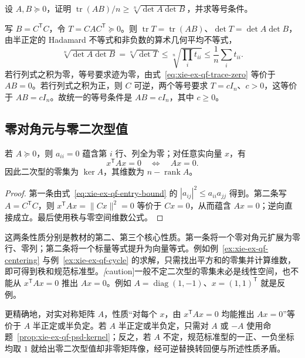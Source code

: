 \begin{example}
设 $A,B\succeq0$，证明 $\operatorname{tr}(AB)/n\ge\sqrt[n]{\det A\det B}$，并求等号条件。
\end{example}
\begin{solve}
写 $B=C^{\mathsf T}C$，令 $T=CAC^{\mathsf T}\succeq0$。则 $\operatorname{tr}T=\operatorname{tr}(AB)$、$\det T=\det A\det B$，由半正定的 Hadamard 不等式和非负数的算术几何平均不等式，
\[
 \sqrt[n]{\det A\det B}
 =\sqrt[n]{\det T}
 \le\sqrt[n]{\prod_i t_{ii}}
 \le\frac1n\sum_i t_{ii}.
\]
若行列式之积为零，等号要求迹为零，由式~\eqref{eq:xie-ex-qf-trace-zero} 等价于 $AB=0$。若行列式之积为正，则 $C$ 可逆，两个等号要求 $T=cI_n$、$c>0$，这等价于 $AB=cI_n$。故统一的等号条件是 $AB=cI_n$，其中 $c\ge0$。
\end{solve}

\subsection{零对角元与零二次型值}

\begin{proposition}
\label{prop:xie-ex-qf-psd-kernel}
若 $A\succeq0$，则 $a_{ii}=0$ 蕴含第 $i$ 行、列全为零；对任意实向量 $x$，有
\begin{equation}
 x^{\mathsf T}Ax=0\quad\Longleftrightarrow\quad Ax=0.
 \label{eq:xie-ex-qf-psd-kernel}
\end{equation}
因此二次型的零集为 $\ker A$，其维数为 $n-\operatorname{rank}A$。
\end{proposition}
\begin{proof}
第一条由式~\eqref{eq:xie-ex-qf-entry-bound} 的 $|a_{ij}|^2\le a_{ii}a_{jj}$ 得到。第二条写 $A=C^{\mathsf T}C$，则 $x^{\mathsf T}Ax=\|Cx\|^2=0$ 等价于 $Cx=0$，从而蕴含 $Ax=0$；逆向直接成立。最后使用秩与零空间维数公式。
\end{proof}

这两条性质分别是教材的第二、第三个核心性质。第一条将一个零对角元扩展为零行、零列；第二条将一个标量等式提升为向量等式。例如例~\ref{ex:xie-ex-qf-centering} 与例~\ref{ex:xie-ex-qf-cycle} 的求解，只需找出平方和的零集并计算维数，即可得到秩和规范标准型。\emph[caution]{一般不定二次型的零集未必是线性空间，也不能从 $x^{\mathsf T}Ax=0$ 推出 $Ax=0$。}例如 $A=\operatorname{diag}(1,-1)$、$x=(1,1)^{\mathsf T}$ 就是反例。

更精确地，对实对称矩阵 $A$，性质“对每个 $x$，由 $x^{\mathsf T}Ax=0$ 均能推出 $Ax=0$”等价于 $A$ 半正定或半负定。若 $A$ 半正定或半负定，只需对 $A$ 或 $-A$ 使用命题~\ref{prop:xie-ex-qf-psd-kernel}；反之，若 $A$ 不定，规范标准型的一正、一负坐标均取 $1$ 就给出零二次型值却非零矩阵像，经可逆替换转回便与所述性质矛盾。

